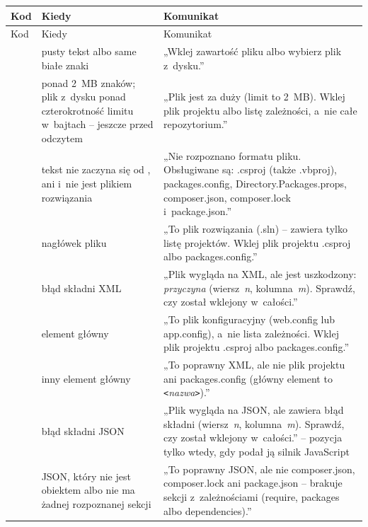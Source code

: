 \begin{xltabular}{\linewidth}{@{}>{\raggedright\arraybackslash}p{3.6cm} >{\raggedright\arraybackslash}p{4.2cm} >{\raggedright\arraybackslash}X@{}}
\toprule
Kod & Kiedy & Komunikat \\
\midrule
\endfirsthead
\toprule
Kod & Kiedy & Komunikat \\
\midrule
\endhead
{} & pusty tekst albo same białe znaki & „Wklej zawartość pliku albo wybierz plik z~dysku.” \\
 & ponad 2~MB znaków; plik z~dysku ponad czterokrotność limitu w~bajtach -- jeszcze przed odczytem & „Plik jest za duży (limit to 2~MB). Wklej plik projektu albo listę zależności, a~nie całe repozytorium.” \\
 & tekst nie zaczyna się od \repopath{<}, \repopath{\{} ani \repopath{[} i~nie jest plikiem rozwiązania & „Nie rozpoznano formatu pliku. Obsługiwane są: .csproj (także .vbproj), packages.config, Directory.Packages.props, composer.json, composer.lock i~package.json.” \\
 & nagłówek pliku  & „To plik rozwiązania (.sln) -- zawiera tylko listę projektów. Wklej plik projektu .csproj albo packages.config.” \\
 & błąd składni XML & „Plik wygląda na XML, ale jest uszkodzony: \emph{przyczyna} (wiersz~\emph{n}, kolumna~\emph{m}). Sprawdź, czy został wklejony w~całości.” \\
 & element główny  & „To plik konfiguracyjny (web.config lub app.config), a~nie lista zależności. Wklej plik projektu .csproj albo packages.config.” \\
 & inny element główny & „To poprawny XML, ale nie plik projektu ani packages.config (główny element to \texttt{<}\emph{nazwa}\texttt{>}).” \\
 & błąd składni JSON & „Plik wygląda na JSON, ale zawiera błąd składni (wiersz~\emph{n}, kolumna~\emph{m}). Sprawdź, czy został wklejony w~całości.” -- pozycja tylko wtedy, gdy podał ją silnik JavaScript \\
 & JSON, który nie jest obiektem albo nie ma żadnej rozpoznanej sekcji & „To poprawny JSON, ale nie composer.json, composer.lock ani package.json -- brakuje sekcji z~zależnościami (require, packages albo dependencies).” \\

\end{xltabular}
